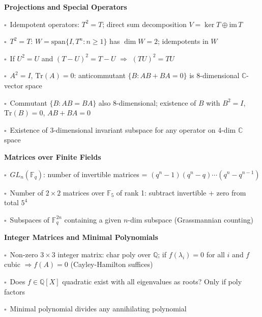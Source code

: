 \documentclass[11pt,a4paper]{article}
\newcommand{\chk}{\textcolor{rulegray}{$\square$}\ }
\begin{document}
\begin{subtopics}
  \item \textbf{Projections and Special Operators}
  \begin{subtopics}
    \item \chk Idempotent operators: $T^2=T$; direct sum decomposition $V=\ker T \oplus \mathrm{im}\, T$
    \item \chk $T^2=T$: $W=\mathrm{span}\{I,T^n:n\ge 1\}$ has $\dim W=2$; idempotents in $W$
    \item \chk If $U^2=U$ and $(T-U)^2=T-U$ $\Rightarrow$ $(TU)^2=TU$
    \item \chk $A^2=I$, $\mathrm{Tr}(A)=0$: anticommutant $\{B:AB+BA=0\}$ is 8-dimensional $\mathbb{C}$-vector space
    \item \chk Commutant $\{B:AB=BA\}$ also 8-dimensional; existence of $B$ with $B^2=I$, $\mathrm{Tr}(B)=0$, $AB+BA=0$
    \item \chk Existence of 3-dimensional invariant subspace for any operator on 4-dim $\mathbb{C}$ space
  \end{subtopics}

  \item \textbf{Matrices over Finite Fields}
  \begin{subtopics}
    \item \chk $GL_n(\mathbb{F}_q)$: number of invertible matrices = $(q^n-1)(q^n-q)\cdots(q^n-q^{n-1})$
    \item \chk Number of $2\times 2$ matrices over $\mathbb{F}_5$ of rank 1: subtract invertible + zero from total $5^4$
    \item \chk Subspaces of $\mathbb{F}_q^{2n}$ containing a given $n$-dim subspace (Grassmannian counting)
  \end{subtopics}

  \item \textbf{Integer Matrices and Minimal Polynomials}
  \begin{subtopics}
    \item \chk Non-zero $3\times 3$ integer matrix: char poly over $\mathbb{Q}$; if $f(\lambda_i)=0$ for all $i$ and $f$ cubic $\Rightarrow f(A)=0$ (Cayley-Hamilton suffices)
    \item \chk Does $f \in \mathbb{Q}[X]$ quadratic exist with all eigenvalues as roots? Only if poly factors
    \item \chk Minimal polynomial divides any annihilating polynomial
  \end{subtopics}

\end{subtopics}
\end{document}
